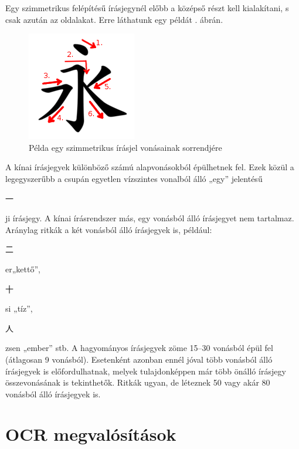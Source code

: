 Egy szimmetrikus felépítésű írásjegynél előbb a középső részt kell kialakítani, s csak azután az oldalakat. Erre láthatunk egy példát . ábrán.

\begin{figure}[h]
	\centering
	\includegraphics[scale=1.0]{images/vonasrend_ordered.png}
	\caption{Példa egy szimmetrikus írásjel vonásainak sorrendjére}
	\label{fig:sorrend_pelda}
\end{figure}

A kínai írásjegyek különböző számú alapvonásokból épülhetnek fel. Ezek közül a legegyszerűbb a csupán egyetlen vízszintes vonalból álló „egy” jelentésű \begin{CJK*}{UTF8}{gbsn}
一
\end{CJK*} ji írásjegy. A kínai írásrendszer más, egy vonásból álló írásjegyet nem tartalmaz. Aránylag ritkák a két vonásból álló írásjegyek is, például: \begin{CJK*}{UTF8}{gbsn}
二
\end{CJK*} er„kettő”,
\begin{CJK*}{UTF8}{gbsn}
十
\end{CJK*} si „tíz”,
\begin{CJK*}{UTF8}{gbsn}
人
\end{CJK*} zsen „ember” stb. A hagyományos írásjegyek zöme 15–30 vonásból épül fel (átlagosan 9 vonásból). Esetenként azonban ennél jóval több vonásból álló írásjegyek is előfordulhatnak, melyek tulajdonképpen már több önálló írásjegy összevonásának is tekinthetők. Ritkák ugyan, de léteznek 50 vagy akár 80 vonásból álló írásjegyek is.

\section{OCR megvalósítások}

